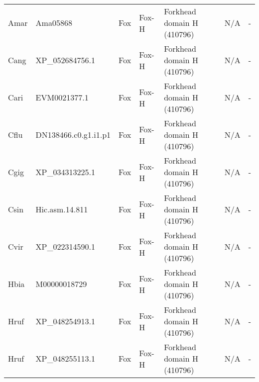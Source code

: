 \documentclass[../main.tex]{subfiles}
\begin{document}
\begin{landscape}
\begin{longtable}{lllllll}
		Amar           & Ama05868              & Fox            & Fox-H               & Forkhead domain H (410796)                  & N/A                                                                    & -                    \\
		Cang           & XP\_052684756.1       & Fox            & Fox-H               & Forkhead domain H (410796)                  & N/A                                                                    & -                    \\
		Cari           & EVM0021377.1          & Fox            & Fox-H               & Forkhead domain H (410796)                  & N/A                                                                    & -                    \\
		Cflu           & DN138466.c0.g1.i1.p1  & Fox            & Fox-H               & Forkhead domain H (410796)                  & N/A                                                                    & -                    \\
		Cgig           & XP\_034313225.1       & Fox            & Fox-H               & Forkhead domain H (410796)                  & N/A                                                                    & -                    \\
		Csin           & Hic.asm.14.811        & Fox            & Fox-H               & Forkhead domain H (410796)                  & N/A                                                                    & -                    \\
		Cvir           & XP\_022314590.1       & Fox            & Fox-H               & Forkhead domain H (410796)                  & N/A                                                                    & -                    \\
		Hbia           & M00000018729          & Fox            & Fox-H               & Forkhead domain H (410796)                  & N/A                                                                    & -                    \\
		Hruf           & XP\_048254913.1       & Fox            & Fox-H               & Forkhead domain H (410796)                  & N/A                                                                    & -                    \\
		Hruf           & XP\_048255113.1       & Fox            & Fox-H               & Forkhead domain H (410796)                  & N/A                                                                    & -                    \\

\end{longtable}
\end{landscape}
\end{document}
